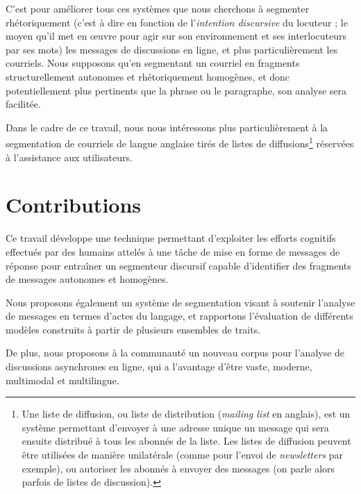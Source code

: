 C'est pour améliorer tous ces systèmes que nous cherchons à segmenter rhétoriquement (c'est à dire en fonction de l'\textit{intention discursive} du locuteur ; le moyen qu'il met en œuvre pour agir sur son environnement et ses interlocuteurs par ses mots) les messages de discussions en ligne, et plus particulièrement les courriels. Nous supposons qu'en segmentant un courriel en fragments structurellement autonomes et rhétoriquement homogènes, et donc potentiellement plus pertinents que la phrase ou le paragraphe, son analyse sera facilitée.

Dans le cadre de ce travail, nous nous intéressons plus particulièrement à la segmentation de courriels de langue anglaise tirés de listes de diffusions\footnote{Une liste de diffusion, ou liste de distribution (\textit{mailing list} en anglais), est un système permettant d'envoyer à une adresse unique un message qui sera ensuite distribué à tous les abonnés de la liste. Les listes de diffusion peuvent être utilisées de manière unilatérale (comme pour l'envoi de \textit{newsletters} par exemple), ou autoriser les abonnés à envoyer des messages (on parle alors parfois de listes de discussion).} réservées à l'assistance aux utilisateurs.

\section{Contributions}

Ce travail développe une technique permettant d'exploiter les efforts cognitifs effectués par des humains attelés à une tâche de mise en forme de messages de réponse pour entraîner un segmenteur discursif capable d'identifier des fragments de messages autonomes et homogènes.

Nous proposons également un système de segmentation visant à soutenir l'analyse de messages en termes d'actes du langage, et rapportons l'évaluation de différents modèles construits à partir de plusieurs ensembles de traits.

De plus, nous proposons à la communauté un nouveau corpus pour l'analyse de discussions asynchrones en ligne, qui a l'avantage d'être vaste, moderne, multimodal et multilingue.